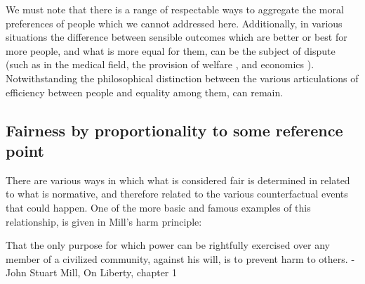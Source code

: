We must note that there is a range of respectable ways to aggregate the moral preferences of people which we cannot addressed here.
Additionally, in various situations the difference between sensible outcomes which are better or best for more people, and what is more equal for them, can be the subject of dispute (such as in the medical field\cite{Reidpath2012,RePEc:chy:respap:120cherp}, the provision of welfare \cite{10.2307/27522452}, and economics \cite{10.1093/oep/gpz040}). Notwithstanding the philosophical distinction between the various articulations of efficiency between people and equality among them, can remain.



\subsection{Fairness by proportionality to some reference point}\label{sec:reference_points}

There are various ways in which what is considered fair is determined in related to what is normative, and therefore related to the various counterfactual events that could happen.
One of the more basic and famous examples of this relationship, is given in Mill's harm principle:

\begin{displayquote}
That the only purpose for which power can be rightfully exercised over any member of a civilized community, against his will, is to prevent harm to others. - John Stuart Mill, On Liberty, chapter 1 \cite{Mill2Gutenberg}
\end{displayquote}


